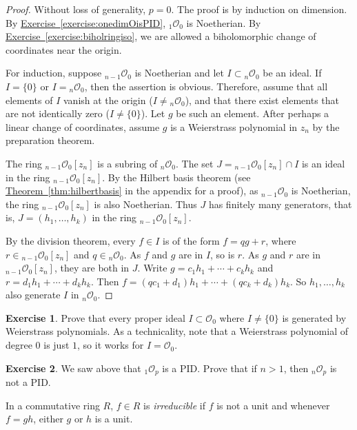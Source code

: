 \documentclass[12pt,openany]{book}
\newcommand{\sO}{{\mathscr{O}}}
\newcommand{\myindex}[1]{#1\index{#1}}
\theoremstyle{plain}
\theoremstyle{remark}
\theoremstyle{definition}
\newenvironment{exbox}{%
    \def\FrameCommand{\vrule width 1pt \relax\hspace{10pt}}%
    \MakeFramed{\advance\hsize-\width\FrameRestore}%
}{%
    \endMakeFramed
}
\theoremstyle{exercise}
\newtheorem{exercise}{Exercise}[section]
\theoremstyle{example}
\newcommand{\exerciseref}[1]{\hyperref[#1]{Exercise~\ref*{#1}}}
\newcommand{\thmref}[1]{\hyperref[#1]{Theorem~\ref*{#1}}}
\begin{document}
\begin{proof}
Without loss of generality, $p=0$.
The proof is by induction on dimension.
By \exerciseref{exercise:onedimOisPID}, ${}_1\sO_0$ is Noetherian.
By \exerciseref{exercise:biholringiso}, we are allowed a
biholomorphic change of coordinates near the origin.

For induction, suppose ${}_{n-1}\sO_0$ is Noetherian
and let $I \subset {}_n \sO_0$ be an ideal.
If $I = \{ 0 \}$
or $I = {}_n \sO_0$, then the assertion is obvious.  Therefore, assume
that all elements of $I$ vanish at the origin ($I \not= {}_n \sO_0$), and
that there exist elements that are not identically zero
($I \not= \{ 0 \}$).  Let $g$
be such an element.  After perhaps a linear change of coordinates,
assume $g$ is a Weierstrass polynomial in $z_n$
by the preparation theorem.

The ring ${}_{n-1}\sO_0[z_n]$ is a subring of ${}_n \sO_0$.
The set $J= {}_{n-1}\sO_0[z_n] \cap I$ is an ideal in the
ring ${}_{n-1}\sO_0[z_n]$.  By the Hilbert basis theorem (see
\thmref{thm:hilbertbasis} in the appendix for a proof), as
${}_{n-1}\sO_0$ is Noetherian, the ring
${}_{n-1}\sO_0[z_n]$ is also Noetherian.  Thus $J$ has finitely many
generators,
that is, $J = (h_1,\ldots,h_k)$ in the ring ${}_{n-1}\sO_0[z_n]$.

By the division theorem,
every $f \in I$ is of the form $f = qg+r$, where $r \in {}_{n-1}\sO_0[z_n]$
and $q \in {}_n\sO_0$.
As $f$ and $g$ are in $I$, so is $r$.
As $g$ and $r$ are in ${}_{n-1}\sO_0[z_n]$,
they are both in $J$.
Write
$g = c_1 h_1 + \cdots + c_k h_k$ and
$r = d_1 h_1 + \cdots + d_k h_k$.  Then
$f = (qc_1 + d_1) h_1 + \cdots + (qc_k + d_k) h_k$.
So
$h_1,\ldots,h_k$ also generate $I$ in ${}_n \sO_0$.
\end{proof}

\begin{exbox}
\begin{exercise}
Prove that every proper ideal $I \subset \sO_0$ where $I \not= \{ 0 \}$
is generated by Weierstrass polynomials.  As a technicality,
note that a
Weierstrass polynomial of degree $0$ is just $1$, so it works for $I = \sO_0$.
\end{exercise}

\begin{exercise}
We saw above that
${}_1\sO_p$ is a PID\@.  Prove that
if $n > 1$, then ${}_n\sO_p$ is not a PID\@.
\end{exercise}
\end{exbox}

In a commutative ring $R$, $f \in R$ is
\emph{\myindex{irreducible}} if $f$ is not a unit and whenever $f=gh$,
either $g$ or $h$ is a unit.
\end{document}

